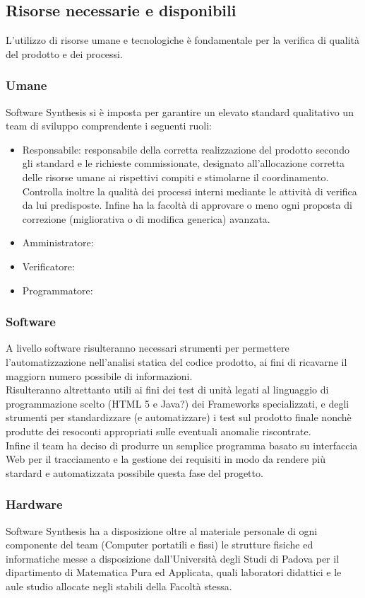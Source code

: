 \subsection{Risorse necessarie e disponibili}
L'utilizzo di risorse umane e tecnologiche è fondamentale per la verifica di qualità del prodotto e dei processi. 
\subsubsection{Umane}
Software Synthesis si è imposta per garantire un elevato standard qualitativo un team di sviluppo comprendente i seguenti ruoli:
\begin{itemize}
\item Responsabile: responsabile della corretta realizzazione del prodotto secondo gli standard e le richieste commissionate, designato all'allocazione corretta delle risorse umane ai rispettivi compiti e stimolarne il coordinamento. 
Controlla inoltre la qualità dei processi interni mediante le attività di verifica da lui predisposte. Infine ha la facoltà di approvare o meno ogni proposta di correzione (migliorativa o di modifica generica) avanzata.\\

\item Amministratore:
\item Verificatore:
\item Programmatore:
\end{itemize}
\subsubsection{Software}
A livello software risulteranno necessari strumenti per permettere l'automatizzazione nell'analisi statica del codice prodotto, ai fini di ricavarne il maggiorn numero possibile di informazioni.\\
Risulteranno altrettanto utili ai fini dei test di unità legati al linguaggio di programmazione scelto (HTML 5 e Java?) dei Frameworks specializzati, e degli strumenti per standardizzare (e automatizzare) i test sul prodotto finale nonchè produtte dei resoconti appropriati sulle eventuali anomalie riscontrate.\\
Infine il team ha deciso di produrre un semplice programma basato su interfaccia Web per il tracciamento e la gestione dei requisiti in modo da rendere più stardard e automatizzata possibile questa fase del progetto.
\subsubsection{Hardware}
Software Synthesis ha a disposizione oltre al materiale personale di ogni componente del team (Computer portatili e fissi) le strutture fisiche ed informatiche messe a disposizione dall'Università degli Studi di Padova per il dipartimento di Matematica Pura ed Applicata, quali laboratori didattici e le aule studio allocate negli stabili della Facoltà stessa.

